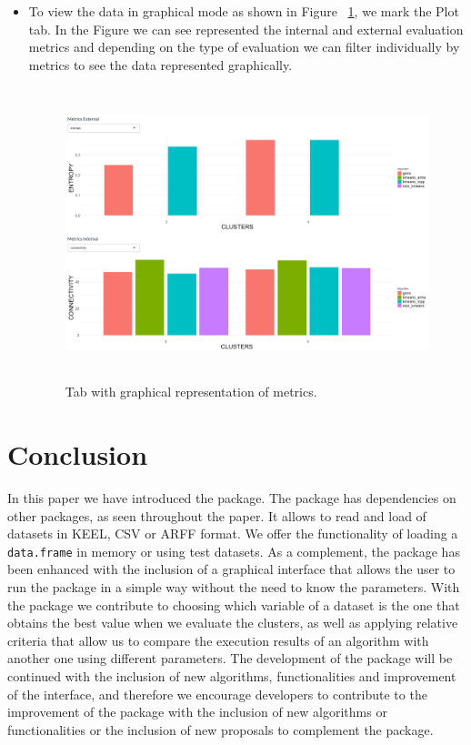 \begin{enumerate}
\begin{itemize}
    \item To view the data in graphical mode as shown in Figure ~\ref{fig:tab_graph}, we mark the Plot tab. In the Figure we can see represented the internal and external evaluation metrics and depending on the type of evaluation we can filter individually by metrics to see the data represented graphically.


  \begin{figure}[htbp]
    \centering
     \includegraphics[width=14cm,height=8.5cm]{img/tab_graph}
      \caption{Tab with graphical representation of metrics.}
      \label{fig:tab_graph}
  \end{figure}

  \end{itemize}

\end{enumerate}
\section{Conclusion}

In this paper we have introduced the  package. The package has dependencies on other packages, as seen throughout the paper. It allows to read and load of datasets in KEEL, CSV or ARFF format. We offer the functionality of loading a \texttt{data.frame} in memory or using test datasets. As a complement, the package has been enhanced with the inclusion of a graphical interface that allows the user to run the package in a simple way without the need to know the parameters. With the package we contribute to choosing which variable of a dataset is the one that obtains the best value when we evaluate the clusters, as well as applying relative criteria that allow us to compare the execution results of an algorithm with another one using different parameters. The development of the package will be continued with the inclusion of new algorithms, functionalities and improvement of the interface, and therefore we encourage developers to contribute to the improvement of the package with the inclusion of new algorithms or functionalities or the inclusion of new proposals to complement the package.

